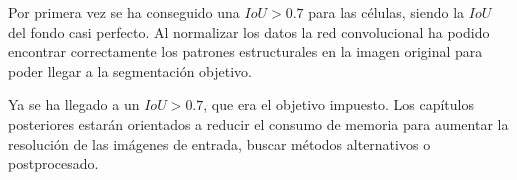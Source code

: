 Por primera vez se ha conseguido una $IoU > 0.7$ para las células, siendo la $IoU$ del fondo casi perfecto. Al normalizar los datos la red convolucional ha podido encontrar correctamente los patrones estructurales en la imagen original para poder llegar a la segmentación objetivo.

Ya se ha llegado a un $IoU > 0.7$, que era el objetivo impuesto. Los capítulos posteriores estarán orientados a reducir el consumo de memoria para aumentar la resolución de las imágenes de entrada, buscar métodos alternativos o postprocesado.